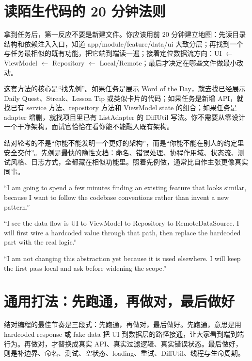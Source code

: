 \section{读陌生代码的 20 分钟法则}

拿到任务后，第一反应不要是新建文件。你应该用前 20 分钟建立地图：先读目录结构和依赖注入入口，知道 app/module/feature/data/ui 大致分层；再找到一个与任务最相似的既有功能，把它端到端读一遍；接着定位数据流方向：UI \(\leftarrow\) ViewModel \(\leftarrow\) Repository \(\leftarrow\) Local/Remote；最后才决定在哪些文件做最小改动。

这套方法的核心是“找先例”。如果任务是展示 Word of the Day，就去找已经展示 Daily Quest、Streak、Lesson Tip 或类似卡片的代码；如果任务是新增 API，就找已有 service 方法、repository 方法和 ViewModel state 的组合；如果任务是 adapter 增删，就找项目里已有 ListAdapter 的 DiffUtil 写法。你不需要从零设计一个干净架构，面试官恰恰在看你能不能融入既有架构。

\begin{idea}
结对轮考的不是“你能不能发明一个更好的架构”，而是“你能不能在别人的约定里安全交付”。先例是最快的隐性文档：命名、错误处理、协程作用域、状态流、测试风格、日志方式，全都藏在相似功能里。照着先例做，通常比自作主张更像真实同事。
\end{idea}

\begin{sayit}[把读代码方法说出来]
“I am going to spend a few minutes finding an existing feature that looks similar, because I want to follow the codebase conventions rather than invent a new pattern.”

“I see the data flow is UI to ViewModel to Repository to RemoteDataSource. I will first wire a hardcoded value through that path, then replace the hardcoded part with the real logic.”

“I am not changing this abstraction yet because it is used elsewhere. I will keep the first pass local and ask before widening the scope.”
\end{sayit}

\section{通用打法：先跑通，再做对，最后做好}

结对编程的最佳节奏是三段式：先跑通，再做对，最后做好。先跑通，意思是用 hardcoded response 或 fake data 把 UI 到数据层的路径接通，让大家看到端到端行为。再做对，才替换成真实 API、真实过滤逻辑、真实错误状态。最后做好，则是补边界、命名、测试、空状态、loading、重试、DiffUtil、线程与生命周期。

